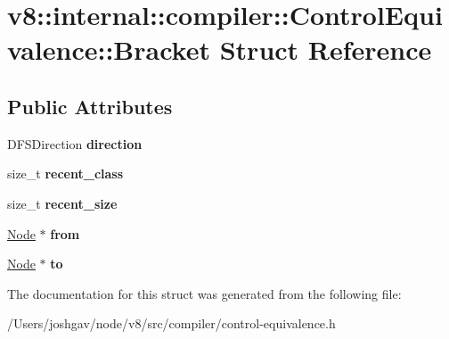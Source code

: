 \hypertarget{structv8_1_1internal_1_1compiler_1_1_control_equivalence_1_1_bracket}{}\section{v8\+:\+:internal\+:\+:compiler\+:\+:Control\+Equivalence\+:\+:Bracket Struct Reference}
\label{structv8_1_1internal_1_1compiler_1_1_control_equivalence_1_1_bracket}
\subsection*{Public Attributes}
\begin{DoxyCompactItemize}
\item 
D\+F\+S\+Direction {\bfseries direction}\hypertarget{structv8_1_1internal_1_1compiler_1_1_control_equivalence_1_1_bracket_a03f533bfa375e2eb20e3074c36206fe3}{}\label{structv8_1_1internal_1_1compiler_1_1_control_equivalence_1_1_bracket_a03f533bfa375e2eb20e3074c36206fe3}

\item 
size\+\_\+t {\bfseries recent\+\_\+class}\hypertarget{structv8_1_1internal_1_1compiler_1_1_control_equivalence_1_1_bracket_a8c21a771ce625a5b10931d92d77b6203}{}\label{structv8_1_1internal_1_1compiler_1_1_control_equivalence_1_1_bracket_a8c21a771ce625a5b10931d92d77b6203}

\item 
size\+\_\+t {\bfseries recent\+\_\+size}\hypertarget{structv8_1_1internal_1_1compiler_1_1_control_equivalence_1_1_bracket_ac376e37403a47d7cee63cb7d1393b918}{}\label{structv8_1_1internal_1_1compiler_1_1_control_equivalence_1_1_bracket_ac376e37403a47d7cee63cb7d1393b918}

\item 
\hyperlink{classv8_1_1internal_1_1compiler_1_1_node}{Node} $\ast$ {\bfseries from}\hypertarget{structv8_1_1internal_1_1compiler_1_1_control_equivalence_1_1_bracket_a5d04dbba8842fbb3feb3f8a347733867}{}\label{structv8_1_1internal_1_1compiler_1_1_control_equivalence_1_1_bracket_a5d04dbba8842fbb3feb3f8a347733867}

\item 
\hyperlink{classv8_1_1internal_1_1compiler_1_1_node}{Node} $\ast$ {\bfseries to}\hypertarget{structv8_1_1internal_1_1compiler_1_1_control_equivalence_1_1_bracket_ad091bfaa6791853a9a62b631508878e6}{}\label{structv8_1_1internal_1_1compiler_1_1_control_equivalence_1_1_bracket_ad091bfaa6791853a9a62b631508878e6}

\end{DoxyCompactItemize}


The documentation for this struct was generated from the following file\+:\begin{DoxyCompactItemize}
\item 
/\+Users/joshgav/node/v8/src/compiler/control-\/equivalence.\+h\end{DoxyCompactItemize}

